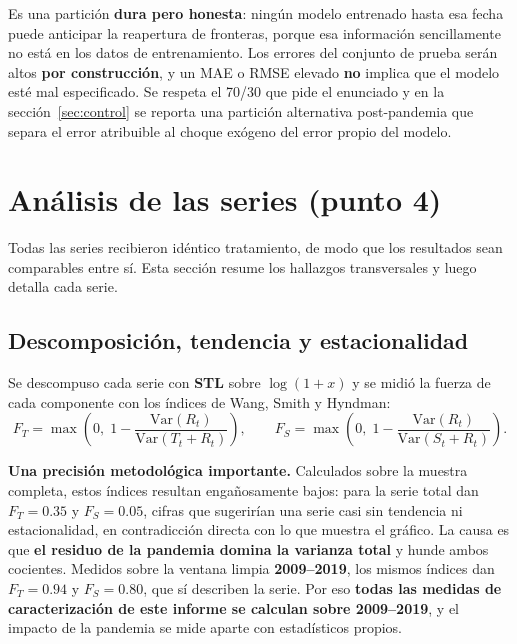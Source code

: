 \documentclass[12pt,letterpaper]{article}
\newcommand{\seccion}[1]{\section{#1}}
\newcommand{\subseccion}[1]{\subsection{#1}}
\begin{document}
Es una partición \textbf{dura pero honesta}: ningún modelo entrenado hasta esa fecha puede
anticipar la reapertura de fronteras, porque esa información sencillamente no está en los datos
de entrenamiento. Los errores del conjunto de prueba serán altos \textbf{por construcción}, y un
MAE o RMSE elevado \textbf{no} implica que el modelo esté mal especificado. Se respeta el 70/30
que pide el enunciado y en la sección~\ref{sec:control} se reporta una partición alternativa
post-pandemia que separa el error atribuible al choque exógeno del error propio del modelo.

\seccion{Análisis de las series (punto 4)}

Todas las series recibieron idéntico tratamiento, de modo que los resultados sean comparables
entre sí. Esta sección resume los hallazgos transversales y luego detalla cada serie.

\subseccion{Descomposición, tendencia y estacionalidad}

Se descompuso cada serie con \textbf{STL} sobre $\log(1+x)$ y se midió la fuerza de cada
componente con los índices de Wang, Smith y Hyndman:
\[
F_T = \max\!\left(0,\; 1 - \frac{\mathrm{Var}(R_t)}{\mathrm{Var}(T_t + R_t)}\right),
\qquad
F_S = \max\!\left(0,\; 1 - \frac{\mathrm{Var}(R_t)}{\mathrm{Var}(S_t + R_t)}\right).
\]

\textbf{Una precisión metodológica importante.} Calculados sobre la muestra completa, estos
índices resultan engañosamente bajos: para la serie total dan $F_T=0.35$ y $F_S=0.05$, cifras
que sugerirían una serie casi sin tendencia ni estacionalidad, en contradicción directa con lo
que muestra el gráfico. La causa es que \textbf{el residuo de la pandemia domina la varianza
total} y hunde ambos cocientes. Medidos sobre la ventana limpia \textbf{2009--2019}, los mismos
índices dan $F_T=0.94$ y $F_S=0.80$, que sí describen la serie. Por eso \textbf{todas las
medidas de caracterización de este informe se calculan sobre 2009--2019}, y el impacto de la
pandemia se mide aparte con estadísticos propios.
\end{document}
